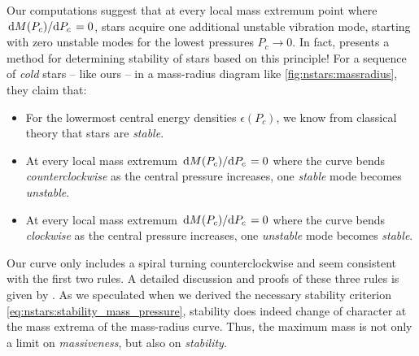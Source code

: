 Our computations suggest that at every local mass extremum point where $\odv{M(P_c)}/{P_c} = 0$, stars acquire one additional unstable vibration mode, starting with zero unstable modes for the lowest pressures $P_c \rightarrow 0$.
In fact, \cite{ref:stability_methods} presents a method for determining stability of stars based on this principle!
For a sequence of \emph{cold} stars -- like ours -- in a mass-radius diagram like \cref{fig:nstars:massradius}, they claim that:
\begin{itemize}
\item For the lowermost central energy densities $\epsilon(P_c)$, we know from classical theory that stars are \emph{stable}.
\item At every local mass extremum $\odv{M(P_c)}/{P_c} = 0$ where the curve bends \emph{counterclockwise} as the central pressure increases, one \emph{stable} mode becomes \emph{unstable}.
\item At every local mass extremum $\odv{M(P_c)}/{P_c} = 0$ where the curve bends \emph{clockwise} as the central pressure increases, one \emph{unstable} mode becomes \emph{stable}.
\end{itemize}
Our curve only includes a spiral turning counterclockwise and seem consistent with the first two rules.
A detailed discussion and proofs of these three rules is given by \cite{ref:stability_rules_thorne}.
As we speculated when we derived the necessary stability criterion \eqref{eq:nstars:stability_mass_pressure}, stability does indeed change of character at the mass extrema of the mass-radius curve.
Thus, the maximum mass is not only a limit on \emph{massiveness}, but also on \emph{stability}.



